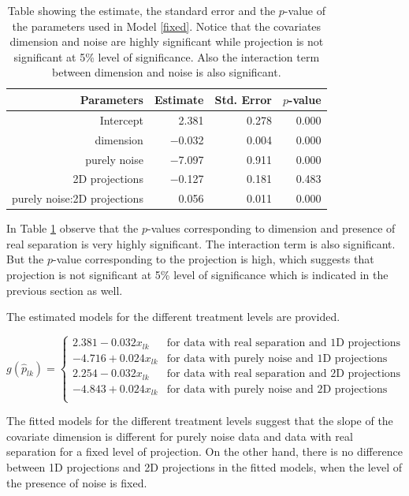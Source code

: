 \documentclass[12]{article}
\begin{document}
\begin{table}[ht]
\begin{center}
\caption{Table showing the estimate, the standard error and the $p$-value of the parameters used in Model \ref{fixed}. Notice that the covariates dimension and noise are highly significant while projection is not significant at 5\% level of significance. Also the interaction term between dimension and noise is also significant.}
\vspace{0.15cm}
\begin{tabular}{r|rrr}
\hline
  \hline
 Parameters & Estimate & Std. Error  & $p$-value \\ 
  \hline
Intercept  & 2.381 & 0.278  & 0.000 \\ 
  dimension & $-$0.032 & 0.004  & 0.000 \\ 
  purely noise & $-$7.097 & 0.911  & 0.000 \\ 
  2D projections & $-$0.127 & 0.181  & 0.483 \\ 
  purely noise:2D projections & 0.056 & 0.011 & 0.000\\
   \hline
\end{tabular}
\label{params}
\end{center}
\end{table}

In Table \ref{params} observe that the $p$-values corresponding to dimension and presence of real separation is very highly significant. The interaction term is also significant. But the $p$-value corresponding to the projection is high, which suggests that projection is not significant at 5\% level of significance which is indicated in the previous section as well.

The estimated models for the different treatment levels are provided. 

$$
g(\hat{p}_{lk}) = \left\{ \begin{array}{rl}
 2.381 - 0.032 x_{lk} &\mbox{for data with real separation and 1D projections} \\
 -4.716 + 0.024 x_{lk} &\mbox{for data with purely noise and 1D projections} \\
  2.254 - 0.032 x_{lk} & \mbox{for data with real separation and 2D projections} \\
  -4.843 + 0.024 x_{lk} &\mbox{for data with purely noise and 2D projections} \\
       \end{array} \right.
$$

The fitted models for the different treatment levels suggest that the slope of the covariate dimension is different for purely noise data and data with real separation for a fixed level of projection. On the other hand, there is no difference between 1D projections and 2D projections in the fitted models, when the level of the presence of noise is fixed.  
\end{document}
